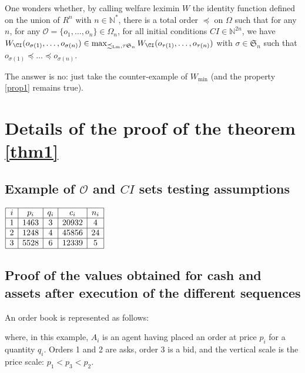 \documentclass[a4paper]{article}
\newcommand{\N}{\mathbb{N}}
\newcommand{\Sg}{\mathfrak{S}}
\newcommand{\Oc}{\mathcal{O}}
\newcommand{\Lms}{\precsim_\mathrm{Lm}}
\newtheorem[style=S, bodystyle=\noindent]{thm}{Theorem}[section]
\newtheorem[style=S, bodystyle=\noindent]{defn}[thm]{Definition}
\newtheorem[style=S, bodystyle=\noindent]{propo}[thm]{Proposition}
\newtheorem[style=S, bodystyle=\noindent]{prop}[thm]{Property}
\newtheorem[style=S, bodystyle=\noindent]{coro}[thm]{Corollary}
\newtheorem[style=S, bodystyle=\noindent]{lem}[thm]{Lemma}
\newtheorem[style=S, headstyle=\bfseries\boldmath Theorem, bodystyle=\noindent]{thm*}{Theorem}
\newtheorem[style=S, headstyle=\bfseries\boldmath Definition, bodystyle=\noindent]{defn*}{Definition}
\newtheorem[style=S, headstyle=\bfseries\boldmath Proposition, bodystyle=\noindent]{propo*}{Proposition}
\newtheorem[style=S, headstyle=\bfseries\boldmath Property, bodystyle=\noindent]{prop*}{Property}
\newtheorem[style=S, headstyle=\bfseries\boldmath Corollary, bodystyle=\noindent]{coro*}{Corollary}
\newtheorem[style=S, headstyle=\bfseries\boldmath Lemma, bodystyle=\noindent]{lem*}{Lemma}
\begin{document}
\par
One wonders whether, by calling welfare leximin $W$ the identity function defined on the union of $R^n$ with $n\in\N^*$, there is a total order $\preceq$ on $\Omega$ such that for any $n$, for any $\Oc = \{o_1,\ldots,o_n\}\in\Omega_n$, for all initial conditions $CI\in\N^{2n}$, we have $W_{\CI}(o_{\sigma(1)},\ldots,o_{\sigma(n)}) \in \max_{\Lms, \tau \Sg_n}W_{\CI}(o_{\tau(1)}, \ldots, o_{\tau(n)})$ with $\sigma \in \Sg_n$ such that $o_{\sigma(1)} \preceq \ldots \preceq o_{\sigma(n)}$.

The answer is no: just take the counter-example of $W_{\min}$ (and the property \ref{prop1} remains true).

\newpage
\appendix

\section{Details of the proof of the theorem \ref{thm1}}

\subsection{Example of $\Oc$ and $CI$ sets testing assumptions}
\label{appendix1}
\begin{center}
$\begin{array}{|c|c|c|c|c|}
	\hline
	i & p_i & q_i & c_i & n_i \\
	\hline
	1 & 1463 & 3 & 20932 & 4 \\
	\hline
	2 & 1248 & 4 & 45856 & 24 \\
	\hline
	3 & 5528 & 6 & 12339 & 5 \\
	\hline
\end{array}$
\end{center}

\subsection{Proof of the values obtained for cash and assets after execution of the different sequences}
\label{appendix2}

\par
An order book is represented as follows:
\begin{center}
\end{center}
where, in this example, $A_i$ is an agent having placed an order at price $p_i$ for a quantity $q_i$. Orders 1 and 2 are asks, order 3 is a bid, and the vertical scale is the price scale: $p_1 < p_3 < p_2$.
\end{document}
